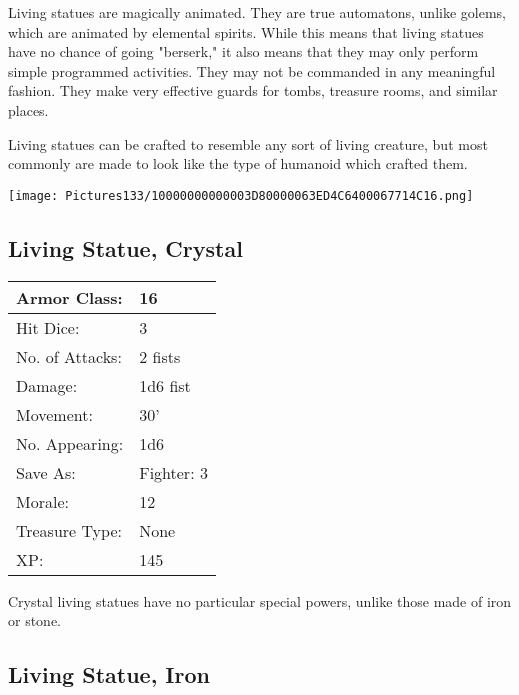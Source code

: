 \documentclass[a4paper,twoside,openany,10pt]{book}
\begin{document}
\begin{multicols}{2}
Living statues are magically animated. They are true automatons, unlike golems, which are animated by elemental spirits. While this means that living statues have no chance of going "berserk," it also means that they may only perform simple programmed activities. They may not be commanded in any meaningful fashion. They make very effective guards for tombs, treasure rooms, and similar places.

Living statues can be crafted to resemble any sort of living creature, but most commonly are made to look like the type of humanoid which crafted them.

\vfill

\begin{center} \texttt{[image: Pictures133/10000000000003D80000063ED4C6400067714C16.png]} \end{center}

\columnbreak


\subsection*{Living Statue, Crystal}\label{living-statue-crystal}

\begin{tabularx}{0.50\textwidth}{@{}lX@{}}
Armor Class: & 16 \\\hline
Hit Dice: & 3 \\\hline
No. of Attacks: & 2 fists \\\hline
Damage: & 1d6 fist \\\hline
Movement: & 30' \\\hline
No. Appearing: & 1d6 \\\hline
Save As: & Fighter: 3 \\\hline
Morale: & 12 \\\hline
Treasure Type: & None \\\hline
XP: & 145 \\\hline
\end{tabularx}\medskip

Crystal living statues have no particular special powers, unlike those made of iron or stone.

\subsection*{Living Statue, Iron}\label{living-statue-iron}


\end{multicols}
\end{document}
